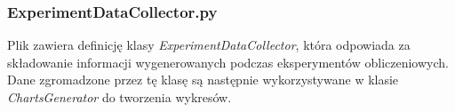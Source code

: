 \subsubsection{ExperimentDataCollector.py}
Plik zawiera definicję klasy \textit{ExperimentDataCollector}, która odpowiada za składowanie informacji wygenerowanych podczas eksperymentów obliczeniowych. Dane zgromadzone przez tę klasę są następnie wykorzystywane w klasie \textit{ChartsGenerator} do tworzenia wykresów.